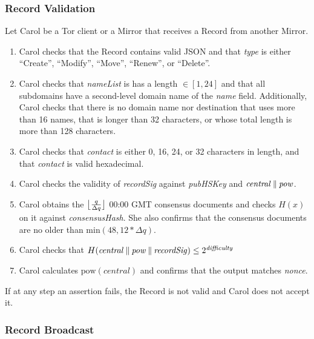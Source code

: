 \subsubsection{Record Validation}

Let Carol be a Tor client or a Mirror that receives a Record from another Mirror.

\begin{enumerate}
	\item Carol checks that the Record contains valid JSON and that \emph{type} is either ``Create'', ``Modify'', ``Move'', ``Renew'', or ``Delete''.
	\item Carol checks that \emph{nameList} is has a length $ \in [1,24] $ and that all subdomains have a second-level domain name of the \emph{name} field. Additionally, Carol checks that there is no domain name nor destination that uses more than 16 names, that is longer than 32 characters, or whose total length is more than 128 characters.
	\item Carol checks that \emph{contact} is either 0, 16, 24, or 32 characters in length, and that \emph{contact} is valid hexadecimal.
	\item Carol checks the validity of \emph{recordSig} against \emph{pubHSKey} and $ \mathit{central} \concat \mathit{pow} $.
	\item Carol obtains the $ \floor[\big]{\frac{q}{\Delta q}} $ 00:00 GMT consensus documents and checks $ H(x) $ on it against \emph{consensusHash}. She also confirms that the consensus documents are no older than $ \mathrm{min}(48, 12 * \Delta q) $.
	\item Carol checks that $ H(\mathit{central} \concat \mathit{pow} \concat \mathit{recordSig}) \leq 2^{\mathit{difficulty}} $
	\item Carol calculates $ \mathrm{pow}(\mathit{central}) $ and confirms that the output matches \emph{nonce}.
\end{enumerate}

If at any step an assertion fails, the Record is not valid and Carol does not accept it.

\subsubsection{Record Broadcast}

